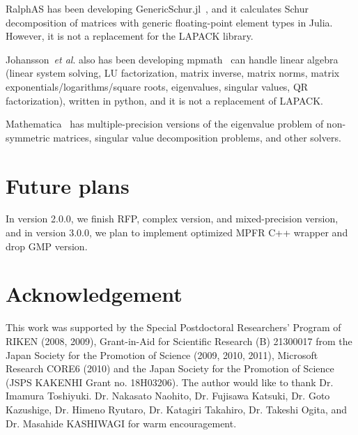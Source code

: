\documentclass[12pt]{article}
\newcommand{\etal}{\textit{et al}.}
\begin{document}
RalphAS has been developing GenericSchur.jl~\cite{GenericSchur}, and it calculates Schur decomposition of matrices with generic floating-point element types in Julia. However, it is not a replacement for the LAPACK library.

Johansson~\etal{} also has been developing mpmath~\cite{mpmath} can handle linear algebra (linear system solving, LU factorization, matrix inverse, matrix norms, matrix exponentials/logarithms/square roots, eigenvalues, singular values, QR factorization), written in python, and it is not a replacement of LAPACK.

Mathematica~\cite{mathematica} has multiple-precision versions of the eigenvalue problem of non-symmetric matrices, singular value decomposition problems, and other solvers.

\section{Future plans}
\label{sec:futureplans}
In version 2.0.0, we finish RFP, complex version, and mixed-precision version, and in version 3.0.0, we plan to implement optimized MPFR C++ wrapper and drop GMP version.

\section*{Acknowledgement}
This work was supported by the Special Postdoctoral Researchers' Program of RIKEN (2008, 2009), Grant-in-Aid for Scientific Research (B) 21300017 from the Japan Society for the Promotion of Science (2009, 2010, 2011), Microsoft Research CORE6 (2010) and the Japan Society for the Promotion of Science (JSPS KAKENHI Grant no. 18H03206). 
The author would like to thank Dr. Imamura Toshiyuki. Dr. Nakasato Naohito, Dr. Fujisawa Katsuki, Dr. Goto Kazushige, Dr. Himeno Ryutaro, Dr. Katagiri Takahiro, Dr. Takeshi Ogita, and Dr. Masahide KASHIWAGI for warm encouragement.


\end{document}
